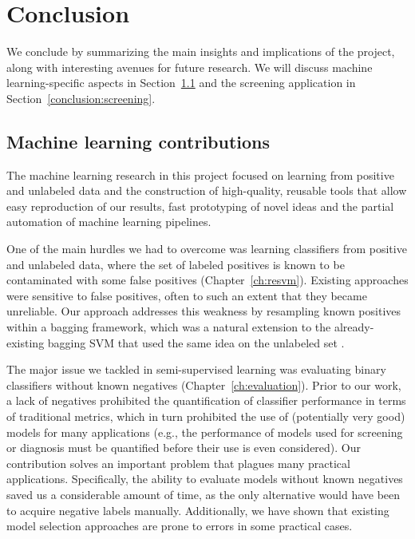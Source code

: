 \chapter{Conclusion}\label{ch:conclusion}

We conclude by summarizing the main insights and implications of the project, along with interesting avenues for future research. We will discuss machine learning-specific aspects in Section~\ref{conclusion:ml} and the screening application in Section~\ref{conclusion:screening}.


\section{Machine learning contributions} \label{conclusion:ml}
The machine learning research in this project focused on learning from positive and unlabeled data and the construction of high-quality, reusable tools that allow easy reproduction of our results, fast prototyping of novel ideas and the partial automation of machine learning pipelines.

One of the main hurdles we had to overcome was learning classifiers from positive and unlabeled data, where the set of labeled positives is known to be contaminated with some false positives (Chapter~\ref{ch:resvm}). Existing approaches were sensitive to false positives, often to such an extent that they became unreliable. Our approach addresses this weakness by resampling known positives within a bagging framework, which was a natural extension to the already-existing bagging SVM that used the same idea on the unlabeled set \citep{mordelet2014bagging}.

The major issue we tackled in semi-supervised learning was evaluating binary classifiers without known negatives (Chapter~\ref{ch:evaluation}). Prior to our work, a lack of negatives prohibited the quantification of classifier performance in terms of traditional metrics, which in turn prohibited the use of (potentially very good) models for many applications (e.g., the performance of models used for screening or diagnosis must be quantified before their use is even considered). Our contribution solves an important problem that plagues many practical applications. Specifically, the ability to evaluate models without known negatives saved us a considerable amount of time, as the only alternative would have been to acquire negative labels manually. Additionally, we have shown that existing model selection approaches are prone to errors in some practical cases. 

